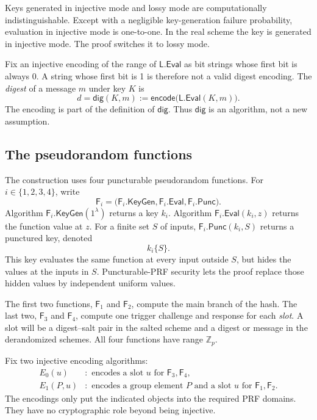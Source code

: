 \documentclass[11pt]{article}
\newcommand{\Zp}{\mathbb{Z}_p}
\newcommand{\Eval}{\mathsf{Eval}}
\newcommand{\KeyGen}{\mathsf{KeyGen}}
\newcommand{\Punc}{\mathsf{Punc}}
\begin{document}
Keys generated in injective mode and lossy mode are computationally
indistinguishable.  Except with a negligible key-generation failure
probability, evaluation in injective mode is one-to-one.  In the real scheme
the key is generated in injective mode.  The proof switches it to lossy mode.

Fix an injective encoding of the range of \(\mathsf{L.Eval}\) as bit strings
whose first bit is always 0.  A string whose first bit is 1 is therefore not a
valid digest encoding.
The \emph{digest} of a message \(m\) under key \(K\) is
\[
  d=\mathsf{dig}(K,m)
  :=
  \mathsf{encode}\bigl(\mathsf{L.Eval}(K,m)\bigr).
\]
The encoding is part of the definition of \(\mathsf{dig}\).  Thus
\(\mathsf{dig}\) is an algorithm, not a new assumption.

\subsection{The pseudorandom functions}

The construction uses four puncturable pseudorandom functions.  For
\(i\in\{1,2,3,4\}\), write
\[
  \mathsf{F}_i
  =
  \bigl(\mathsf{F}_i.\KeyGen,
        \mathsf{F}_i.\Eval,
        \mathsf{F}_i.\Punc\bigr).
\]
Algorithm \(\mathsf{F}_i.\KeyGen(1^\lambda)\) returns a key \(k_i\).
Algorithm \(\mathsf{F}_i.\Eval(k_i,z)\) returns the function value at \(z\).
For a finite set \(S\) of inputs,
\(\mathsf{F}_i.\Punc(k_i,S)\) returns a punctured key, denoted
\[
  k_i\{S\}.
\]
This key evaluates the same function at every input outside \(S\), but hides
the values at the inputs in \(S\).  Puncturable-PRF security lets the proof
replace those hidden values by independent uniform values.

The first two functions, \(\mathsf{F}_1\) and \(\mathsf{F}_2\), compute the
main branch of the hash.  The last two, \(\mathsf{F}_3\) and
\(\mathsf{F}_4\), compute one trigger challenge and response for each
\emph{slot}.  A slot will be a digest--salt pair in the salted scheme and a
digest or message in the derandomized schemes.  All four functions have range
\(\Zp\).

Fix two injective encoding algorithms:
\[
\begin{aligned}
  E_0(u)   &:\text{ encodes a slot \(u\) for }
              \mathsf{F}_3,\mathsf{F}_4,\\
  E_1(P,u) &:\text{ encodes a group element \(P\) and a slot \(u\) for }
              \mathsf{F}_1,\mathsf{F}_2.
\end{aligned}
\]
The encodings only put the indicated objects into the required PRF domains.
They have no cryptographic role beyond being injective.
\end{document}
